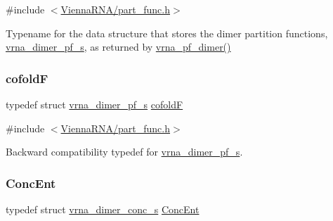 {\ttfamily \#include $<$\mbox{\hyperlink{part__func_8h}{Vienna\+R\+N\+A/part\+\_\+func.\+h}}$>$}



Typename for the data structure that stores the dimer partition functions, \mbox{\hyperlink{group__pf__cofold_structvrna__dimer__pf__s}{vrna\+\_\+dimer\+\_\+pf\+\_\+s}}, as returned by \mbox{\hyperlink{group__pf__cofold_ga4e5c7d06c302a7c59fc0d64dc142ca63}{vrna\+\_\+pf\+\_\+dimer()}} 

\mbox{\label{group__pf__cofold_ga5445d8d96a40e9e79b1fa5a7f1a6b7ea}} 
\subsubsection{\texorpdfstring{cofoldF}{cofoldF}}
{\footnotesize\ttfamily typedef struct \mbox{\hyperlink{group__pf__cofold_structvrna__dimer__pf__s}{vrna\+\_\+dimer\+\_\+pf\+\_\+s}} \mbox{\hyperlink{group__pf__cofold_ga5445d8d96a40e9e79b1fa5a7f1a6b7ea}{cofoldF}}}



{\ttfamily \#include $<$\mbox{\hyperlink{part__func_8h}{Vienna\+R\+N\+A/part\+\_\+func.\+h}}$>$}



Backward compatibility typedef for \mbox{\hyperlink{group__pf__cofold_structvrna__dimer__pf__s}{vrna\+\_\+dimer\+\_\+pf\+\_\+s}}. 

\mbox{\label{group__pf__cofold_ga46244c7adf5040580291c45b465f4efa}} 
\subsubsection{\texorpdfstring{Conc\+Ent}{ConcEnt}}
{\footnotesize\ttfamily typedef struct \mbox{\hyperlink{structvrna__dimer__conc__s}{vrna\+\_\+dimer\+\_\+conc\+\_\+s}} \mbox{\hyperlink{group__pf__cofold_ga46244c7adf5040580291c45b465f4efa}{Conc\+Ent}}}



